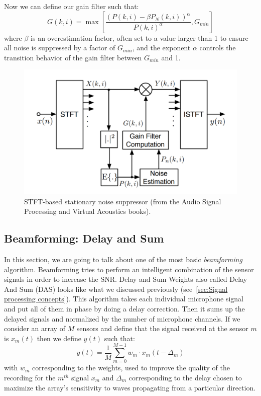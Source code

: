 \documentclass[11pt,a4paper,titlepage]{report}
\begin{document}
Now we can define our gain filter such that:
\begin{equation}
G(k,i) = \max[\frac{(P(k,i)- \beta P_{N}(k,i))^\alpha}{P(k,i)^\alpha}, G_{min}]
\end{equation}
where $\beta$ is an overestimation factor, often set to a value larger than 1 to ensure all noise is suppressed by a factor of $G_{min}$, and the exponent $\alpha$ controls the transition behavior of the gain filter between $G_{min}$ and 1.
\begin{figure}
	\centering
	\includegraphics[width=0.7\linewidth]{rapport4}
	\caption{STFT-based stationary noise suppressor (from the Audio Signal Processing and Virtual Acoustics books).}
	\label{fig:rapport4}
\end{figure}

\subsection{Beamforming: Delay and Sum}
\hspace*{0.6cm}
In this section, we are going to talk about one of the most basic \emph{beamforming} algorithm. Beamforming tries to perform an intelligent combination of the sensor signals in order to increase the SNR. Delay and Sum Weights also called Delay And Sum (DAS) looks like what we discussed previously (see~\ref{sec:Signal processing concepts}). This algorithm takes each individual microphone signal and put all of them in phase by doing a delay correction. Then it sums up the delayed signals and normalized by the number of microphone channels.
If we consider an array of $ M $ sensors and define that the signal received at the sensor $ m $ is $x_m(t)$ then we define $ y(t) $ such that:
\begin{equation}
y(t) = \frac{1}{M}\sum_{m=0}^{M-1}{w_{m}\cdot x_{m}(t-\Delta_{m})}
\end{equation}
with $ w_{m} $ corresponding to the weights, used to improve the quality of the recording for the $ m^{th} $ signal $ x_{m}  $ and $\Delta_{m}$ corresponding to the delay chosen to maximize the array's sensitivity to waves propagating from a particular direction.
\end{document}
